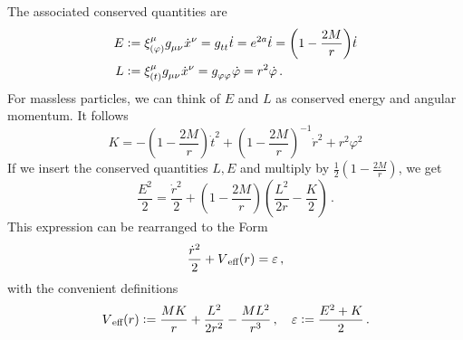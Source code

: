 The associated conserved quantities are
\begin{align}
E&:=\tensor*{\xi}{_{(\varphi)}^\mu}\tensor{g}{_\mu_\nu}\tensor{\dot{x}}{^\nu}
=\tensor{g}{_t_t}\dot{t}
=e^{2a}\dot{t}
=\left(1-\frac{2M}{r}\right)\dot{t}
\\
L&:=\tensor*{\xi}{_{(t)}^\mu}\tensor{g}{_\mu_\nu}\tensor{\dot{x}}{^\nu}
=\tensor{g}{_\varphi_\varphi}\dot{\varphi}
=r^2\dot{\varphi}\,.
\end{align}
For massless
particles, we can think of $E$ and $L$ as conserved energy and angular momentum.
It follows
\begin{equation}
K=-\left(1-\frac{2M}{r}\right)\dot{t}^2+\left(1-\frac{2M}{r}\right)^{-1}\dot{r}^2+r^2\varphi^2
\end{equation}
If we insert the conserved quantities $L,E$ and multiply by
$\frac{1}{2}\left(1-\frac{2M}{r}\right)$, we get
\begin{equation}
\frac{E^2}{2}=\frac{\dot{r}^2}{2}
+\left(1-\frac{2M}{r}\right)\left(\frac{L^2}{2r}-\frac{K}{2}\right)\,.
\end{equation}
This expression can be rearranged to the Form
\begin{equation}
\frac{\dot{r}^2}{2}+V\textsubscript{eff}(r)
=\varepsilon\,,
\end{equation}
with the convenient definitions 
\begin{equation}
V\textsubscript{eff}(r):=\frac{MK}{r}+\frac{L^2}{2r^2}-\frac{ML^2}{r^3}\,,\quad
\varepsilon:=\frac{E^2+K}{2}\,.
\end{equation}
